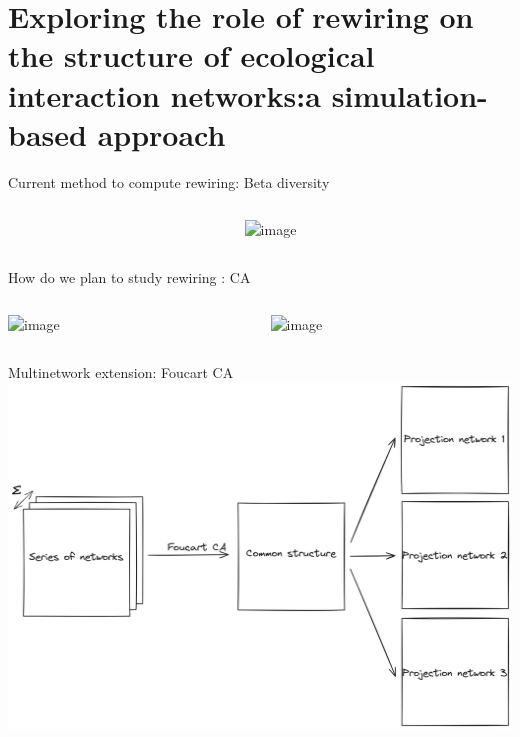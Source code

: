 \documentclass{beamer}
\begin{document}
\section{Exploring the role of rewiring on the structure of ecological interaction networks:\newline a simulation-based approach}


\begin{frame}{Current method to compute rewiring: Beta diversity}
\protect\hypertarget{current-method-to-compute-rewiring}{}
\begin{columns}
  \begin{column}{.5\linewidth}
    \vspace{-1em}
  \end{column}
  \begin{column}{.5\linewidth}
    \includegraphics<1->[width=\linewidth]{figures_slides/beta_div.png}%
  \end{column}
\end{columns}
\end{frame}

\begin{frame}{How do we plan to study rewiring : CA}
\protect\hypertarget{How-do-we-plan-to-study-rewiring-:-CA}{}
\begin{columns}
  \begin{column}{.5\linewidth}
    \includegraphics<1->[width=\linewidth]{figures_slides/network.png}%
  \end{column}
  \begin{column}{.5\linewidth}
    \includegraphics<2->[width=\linewidth]{figures_slides/AFC.png}%
  \end{column}
\end{columns}
\end{frame}
\begin{frame}{Multinetwork extension: Foucart CA}
\protect\hypertarget{foucart-ca}{}
\includegraphics[width=\linewidth]{figures_slides/foucart.png}%
\end{frame}
\end{document}
